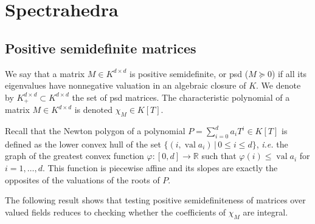\documentclass{elsarticle}
\theoremstyle{plain}
\theoremstyle{definition}
\newcommand{\R}{\mathbb{R}} %
\DeclareMathOperator{\val}{val}
\begin{document}
\section{Spectrahedra}
\label{sec:spectrahedra}
  
\subsection{Positive semidefinite matrices}
\newcommand\Mat{Positive semidefinite matrix }
\newcommand\mats{positive semidefinite matrices }
\newcommand\Mats{positive semidefinite matrices }

\begin{definition}
  We say that a matrix $M \in K^{d \times d}$ is {positive semidefinite, or psd} ($M \succeq 0$)
  if all its eigenvalues have nonnegative valuation in an algebraic closure of $K$.
  We denote by $K^{d \times d}_+ \subset K^{d\times d}$ the set of psd matrices.
  The characteristic polynomial of a matrix $M \in K^{d\times d}$ is denoted $\chi_M \in K[T]$.
\end{definition}

Recall that the {Newton polygon} of a polynomial $P = \sum_{i=0}^{d} a_i T^i \in K[T]$ is
defined as the lower convex hull of the set $\{(i, \val a_i) \,|\, 0 \le i \le d\}$, {\it i.e.} the
graph of the greatest convex function $\varphi : [0,d] \to \R$ such that $\varphi(i) \leq \val a_i$
for $i=1,\ldots,d$. This function is piecewise affine and its slopes are exactly the opposites of the valuations
of the roots of $P$.

The following result shows that testing positive semidefiniteness of matrices over
valued fields reduces to checking whether the coefficients of $\chi_M$ are integral.
\end{document}
